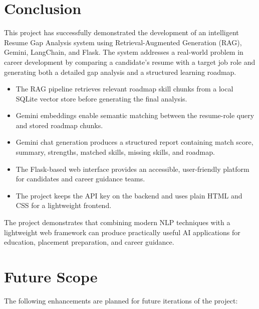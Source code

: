 \documentclass[12pt,a4paper]{report}
\begin{document}
\section{Conclusion}

This project has successfully demonstrated the development of an intelligent
Resume Gap Analysis system using Retrieval-Augmented Generation (RAG), Gemini,
LangChain, and Flask. The system addresses a real-world problem in career
development by comparing a candidate's resume with a target job role and
generating both a detailed gap analysis and a structured learning roadmap.

\begin{itemize}
  \item The RAG pipeline retrieves relevant roadmap skill chunks from a local
        SQLite vector store before generating the final analysis.
  \item Gemini embeddings enable semantic matching between the resume-role query
        and stored roadmap chunks.
  \item Gemini chat generation produces a structured report containing match
        score, summary, strengths, matched skills, missing skills, and roadmap.
  \item The Flask-based web interface provides an accessible, user-friendly
        platform for candidates and career guidance teams.
  \item The project keeps the API key on the backend and uses plain HTML and CSS
        for a lightweight frontend.
\end{itemize}

The project demonstrates that combining modern NLP techniques with a lightweight
web framework can produce practically useful AI applications for education,
placement preparation, and career guidance.

\section{Future Scope}

The following enhancements are planned for future iterations of the project:
\end{document}
